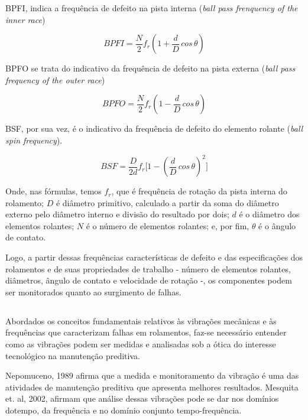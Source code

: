 \documentclass[
	12pt,				
	oneside,			
	a4paper,			
	english,			
	brazil,			
	]{abntex2ppgsi}
\begin{document}
BPFI, indica a frequência de defeito na pista interna (\textit{ball pass frenquency of the inner race})

\begin{equation}
	BPFI = \frac{N}{2}f_{r} \left ( 1 + \frac{d}{D} \,cos \, \theta \right ) 
	\label{eq: BPFI}
\end{equation}

BPFO se trata do indicativo da frequência de defeito na pista externa (\textit{ball pass frequency of the outer race})

\begin{equation}
	BPFO = \frac{N}{2}f_{r} \left ( 1 - \frac{d}{D} \,cos \, \theta \right )
	\label{eq: BPFO}
\end{equation}

BSF, por sua vez, é o indicativo da frequência de defeito do elemento rolante (\textit{ball spin frequency}).

\begin{equation}
	BSF = \frac{D}{2d}f_{r} \Bigg[  1 - \left ( \frac{d}{D} \,cos \, \theta \right ) ^{2}  \Bigg]
	\label{eq: BSF}
\end{equation}

Onde, nas fórmulas, temos $f_{r}$, que é frequência de rotação da pista interna do rolamento; $D$ é diâmetro primitivo, calculado a partir da soma do diâmetro externo pelo diâmetro interno e divisão do resultado por dois; $d$ é o diâmetro dos elementos rolantes; $N$ é o número de elementos rolantes; e, por fim, $\theta$ é o ângulo de contato.

Logo, a partir dessas frequências características de defeito e das especificações dos rolamentos e de suas propriedades de trabalho - número de elementos rolantes, diâmetros, ângulo de contato e velocidade de rotação -, os componentes podem ser monitorados quanto ao surgimento de falhas.  

\subsection{}

Abordados os conceitos  fundamentais relativos às vibrações mecânicas e às frequências que caracterizam falhas em rolamentos, faz-se necessário entender como as vibrações podem ser medidas e analisadas sob a ótica do interesse tecnológico na manutenção preditiva. 

Nepomuceno, 1989 afirma que a medida e monitoramento da vibração é uma das atividades de manutenção preditiva que apresenta melhores resultados. Mesquita et. al, 2002, afirmam que análise dessas vibrações pode se dar nos domínios dotempo, da frequência e no domínio conjunto tempo-frequência.
\end{document}
